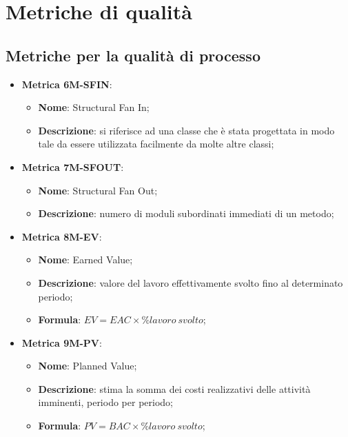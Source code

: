 \section{Metriche di qualità}
\subsection{Metriche per la qualità di processo}

\begin{itemize}
    \item \textbf{Metrica 6M-SFIN}:
    \begin{itemize}
        \item \textbf{Nome}: Structural Fan In;
        \item \textbf{Descrizione}: si riferisce ad una classe che è stata progettata in modo tale da essere utilizzata facilmente da molte altre classi;
    \end{itemize}
\end{itemize}

\begin{itemize}
    \item \textbf{Metrica 7M-SFOUT}:
    \begin{itemize}
        \item \textbf{Nome}: Structural Fan Out;
        \item \textbf{Descrizione}: numero di moduli subordinati immediati di un metodo;
    \end{itemize}
\end{itemize}

\begin{itemize}
    \item \textbf{Metrica 8M-EV}:
    \begin{itemize}
        \item \textbf{Nome}: Earned Value;
        \item \textbf{Descrizione}: valore del lavoro effettivamente svolto fino al determinato periodo;
        \item \textbf{Formula}: $EV = EAC \times \%lavoro\:svolto$;
    \end{itemize}
\end{itemize}

\begin{itemize}
    \item \textbf{Metrica 9M-PV}:
    \begin{itemize}
        \item \textbf{Nome}: Planned Value;
        \item \textbf{Descrizione}: stima la somma dei costi realizzativi delle attività imminenti, periodo per periodo;
        \item \textbf{Formula}: $PV = BAC \times \%lavoro\:svolto$;
    \end{itemize}
\end{itemize}

